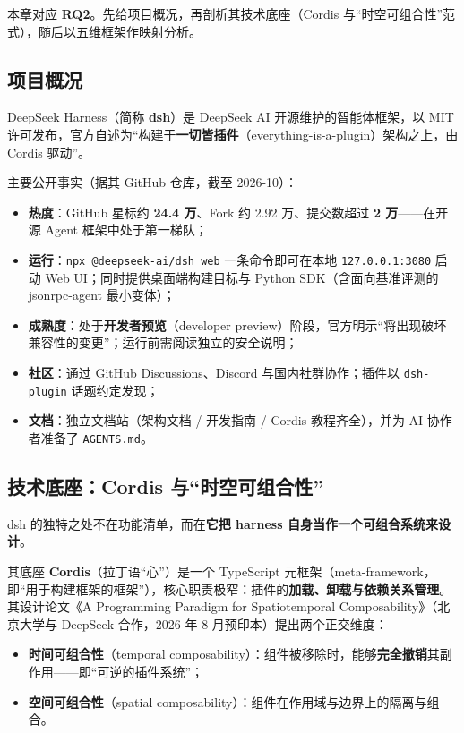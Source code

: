 \documentclass[11pt,a4paper]{ctexart}
\begin{document}
本章对应 \textbf{RQ2}。先给项目概况，再剖析其技术底座（Cordis 与“时空可组合性”范式），随后以五维框架作映射分析。

\subsection{项目概况}

DeepSeek Harness（简称 \textbf{dsh}）是 DeepSeek AI 开源维护的智能体框架，以 MIT 许可发布，官方自述为“构建于\textbf{一切皆插件}（everything-is-a-plugin）架构之上，由 Cordis 驱动”。

主要公开事实（据其 GitHub 仓库，截至 2026-10）：

\begin{itemize}
  \item \textbf{热度}：GitHub 星标约 \textbf{24.4 万}、Fork 约 2.92 万、提交数超过 \textbf{2 万}——在开源 Agent 框架中处于第一梯队；
  \item \textbf{运行}：\texttt{npx @deepseek-ai/dsh web} 一条命令即可在本地 \texttt{127.0.0.1:3080} 启动 Web UI；同时提供桌面端构建目标与 Python SDK（含面向基准评测的 jsonrpc-agent 最小变体）；
  \item \textbf{成熟度}：处于\textbf{开发者预览}（developer preview）阶段，官方明示“将出现破坏兼容性的变更”；运行前需阅读独立的安全说明；
  \item \textbf{社区}：通过 GitHub Discussions、Discord 与国内社群协作；插件以 \texttt{dsh-plugin} 话题约定发现；
  \item \textbf{文档}：独立文档站（架构文档 / 开发指南 / Cordis 教程齐全），并为 AI 协作者准备了 \texttt{AGENTS.md}。
\end{itemize}

\subsection{技术底座：Cordis 与“时空可组合性”}

dsh 的独特之处不在功能清单，而在\textbf{它把 harness 自身当作一个可组合系统来设计}。

其底座 \textbf{Cordis}（拉丁语“心”）是一个 TypeScript 元框架（meta-framework，即“用于构建框架的框架”），核心职责极窄：插件的\textbf{加载、卸载与依赖关系管理}。其设计论文《A Programming Paradigm for Spatiotemporal Composability》（北京大学与 DeepSeek 合作，2026 年 8 月预印本）提出两个正交维度：

\begin{itemize}
  \item \textbf{时间可组合性}（temporal composability）：组件被移除时，能够\textbf{完全撤销}其副作用——即“可逆的插件系统”；
  \item \textbf{空间可组合性}（spatial composability）：组件在作用域与边界上的隔离与组合。
\end{itemize}
\end{document}
